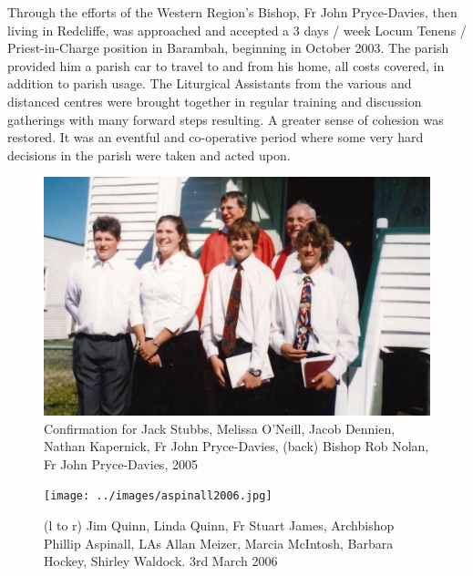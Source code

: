 Through the efforts of the Western Region's Bishop, Fr John Pryce-Davies, then living in Redcliffe, was approached and accepted a 3 days / week Locum Tenens / Priest-in-Charge position in Barambah, beginning in October 2003. The parish provided him a parish car to travel to and from his home, all costs covered, in addition to parish usage. The Liturgical Assistants from the various and distanced centres were brought together in regular training and discussion gatherings with many forward steps resulting. A greater sense of cohesion was restored. It was an eventful and co-operative period where some very hard decisions in the parish were taken and acted upon.









\begin{figure}[!htb]
\begin{center}
\includegraphics[width=1.\textwidth,center]{../images/confirmation2005.jpg}
\caption{Confirmation for Jack Stubbs, Melissa O'Neill, Jacob Dennien, Nathan Kapernick, Fr John Pryce-Davies, (back) Bishop Rob Nolan, Fr John Pryce-Davies, 2005}
\end{center}
\end{figure}










\begin{figure}[!htb]
\begin{center}
\texttt{[image: ../images/aspinall2006.jpg]}
\caption{(l to r) Jim Quinn, Linda Quinn, Fr Stuart James, Archbishop Phillip Aspinall, LAs Allan Meizer, Marcia McIntosh, Barbara Hockey, Shirley Waldock. 3rd March 2006}
\end{center}
\end{figure}




